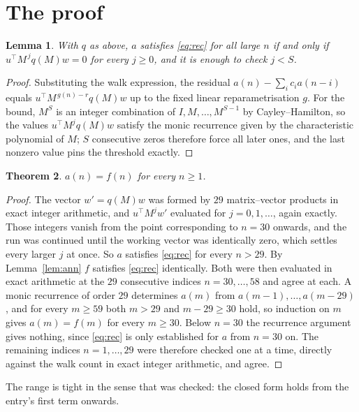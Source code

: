 \documentclass[11pt,a4paper]{article}
\theoremstyle{plain}
\newtheorem{theorem}{Theorem}
\newtheorem{lemma}[theorem]{Lemma}
\theoremstyle{definition}
\begin{document}
\section{The proof}

\begin{lemma}\label{lem:crit}
With $q$ as above, $a$ satisfies \eqref{eq:rec} for all large $n$ if and only if
$u^{\!\top}M^{\,j}q(M)w=0$ for every $j\ge0$, and it is enough to check $j<S$.
\end{lemma}

\begin{proof}
Substituting the walk expression, the residual $a(n)-\sum_ic_ia(n-i)$ equals
$u^{\!\top}M^{\,g(n)-r}q(M)w$ up to the fixed linear reparametrisation $g$. For the bound,
$M^{S}$ is an integer combination of $I,M,\dots,M^{S-1}$ by Cayley--Hamilton, so the values
$u^{\!\top}M^{j}q(M)w$ satisfy the monic recurrence given by the characteristic polynomial of
$M$; $S$ consecutive zeros therefore force all later ones, and the last nonzero value pins the
threshold exactly.
\end{proof}

\begin{theorem}
$a(n)=f(n)$ for every $n\ge1$.
\end{theorem}

\begin{proof}
The vector $w'=q(M)w$ was formed by $29$ matrix--vector products in exact integer
arithmetic, and $u^{\!\top}M^{j}w'$ evaluated for $j=0,1,\dots$, again exactly. Those integers
vanish from the point corresponding to $n=30$ onwards, and the run was continued until the
working vector was identically zero, which settles every larger $j$ at once. So $a$ satisfies
\eqref{eq:rec} for every $n>29$. By Lemma~\ref{lem:ann} $f$ satisfies \eqref{eq:rec}
identically. Both were then evaluated in exact arithmetic at the $29$ consecutive indices
$n=30,\dots,58$ and agree at each. A monic recurrence of order $29$
determines $a(m)$ from $a(m-1),\dots,a(m-29)$, and for every $m\ge59$ both
$m>29$ and $m-29\ge30$ hold, so induction on $m$ gives $a(m)=f(m)$ for every
$m\ge30$.
Below $n=30$ the recurrence argument gives nothing, since \eqref{eq:rec} is only
established for $a$ from $n=30$ on. The remaining indices $n=1,\dots,29$ were
therefore checked one at a time, directly against the walk count in exact integer arithmetic,
and agree.
\end{proof}

The range is tight in the sense that was checked: the closed form holds from the entry's first term onwards.
\end{document}
